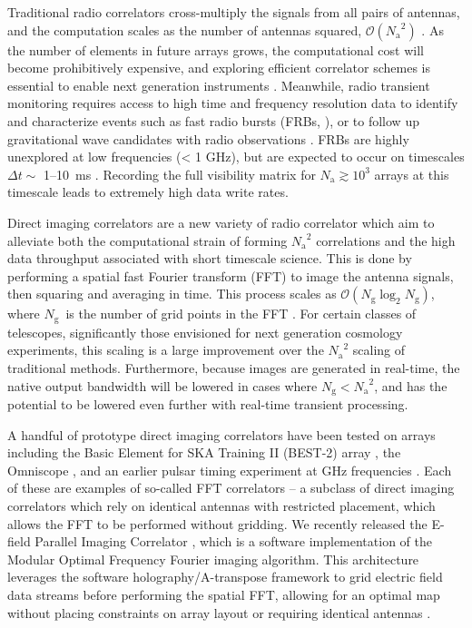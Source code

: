 \documentclass[a4paper,fleqn,usenatbib]{mnras}
\newcommand{\Nant}{\ensuremath{N_{\mathrm{a}}}}
\newcommand{\Ng}{\ensuremath{N_{\mathrm{g}}}}
\begin{document}
Traditional radio correlators cross-multiply the signals from all pairs of antennas, and 
the computation scales as the number of antennas squared, $\mathcal{O}(\Nant^2)$ 
\citep{bun04}. As the number of elements in future arrays grows, the computational cost will 
become prohibitively expensive, and exploring efficient correlator schemes is essential to 
enable next generation instruments \citep{lon00}. Meanwhile, radio transient monitoring 
requires access to high time and frequency resolution data to identify and characterize events 
such as fast radio bursts (FRBs, \citealt{lor07}), or to follow up gravitational wave candidates 
with radio observations \citep{abb16a,abb16b}. FRBs are highly unexplored at low frequencies 
(< 1 GHz), but are expected to occur on timescales $\Delta t \sim$ 1--10~ms \citep{tho13}. 
Recording the full visibility matrix for $\Nant \gtrsim 10^3$ arrays at this timescale leads to 
extremely high data write rates. 

Direct imaging correlators are a new variety of radio correlator which aim to alleviate both the 
computational strain of forming $\Nant^2$ correlations and the high data throughput associated 
with short timescale science. This is done by performing a spatial fast Fourier transform (FFT) 
to image the antenna signals, then squaring and averaging in time. This process scales as 
$\mathcal{O}(\Ng \log_2 \Ng)$, where \Ng~is the number of grid points in the FFT \citep{mor11,
 teg09, teg10}. For certain classes of telescopes, significantly those envisioned for next 
 generation cosmology experiments, this scaling is a large improvement over the $\Nant^2$ 
 scaling of traditional methods. Furthermore, because images are generated in real-time, the native 
 output bandwidth will be lowered in cases where $\Ng < \Nant^2$, and has the potential to be 
 lowered even further with real-time transient processing.

A handful of prototype direct imaging correlators have been tested on arrays including the 
Basic Element for SKA Training II (BEST-2) array \citep{fos14}, the Omniscope \citep{zhe14}, 
and an earlier pulsar timing experiment at GHz frequencies \citep{oto94, dai00}. Each of these 
are examples of so-called FFT correlators -- a subclass of direct imaging correlators which rely 
on identical antennas with restricted placement, which allows the FFT to be performed without 
gridding. We recently released the E-field Parallel Imaging Correlator \citep[EPIC;][]{thy15c}, 
which is a software implementation of the Modular Optimal Frequency Fourier \citep[MOFF;][]
{mor11} imaging algorithm. This architecture leverages the software holography/A-transpose 
framework to grid electric field data streams before performing the spatial FFT, allowing for an 
optimal map without placing constraints on array layout or requiring identical antennas 
\citep{mor09,bha08,teg97a}.
\end{document}
